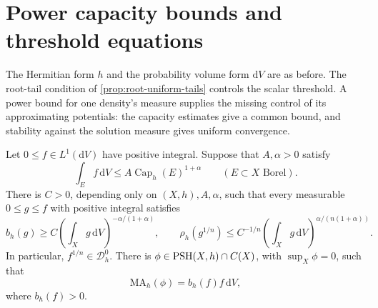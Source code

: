 \section{Power capacity bounds and threshold equations}
\label{sec:power-capacity-threshold}

The Hermitian form $h$ and the probability volume form $\mathrm dV$ are as before. The root-tail condition of \cref{prop:root-uniform-tails} controls the scalar threshold. A power bound for one density's measure supplies the missing control of its approximating potentials: the capacity estimates give a common bound, and stability against the solution measure gives uniform convergence.

\begin{theorem}\label{thm:power-capacity-critical-equation}
Let $0\leq f\in L^1(\mathrm dV)$ have positive integral. Suppose that $A,\alpha>0$ satisfy
\begin{equation}\label{eq:datum-power-capacity}
 \int_Ef\,\mathrm dV\leq A\operatorname{Cap}_h(E)^{1+\alpha}
 \qquad(E\subset X\text{ Borel}).
\end{equation}
There is $C>0$, depending only on $(X,h),A,\alpha$, such that every measurable $0\leq g\leq f$ with positive integral satisfies
\begin{equation}\label{eq:power-capacity-critical-bound}
 b_h(g)\geq C\left(\int_Xg\,\mathrm dV\right)^{-\alpha/(1+\alpha)},
 \qquad
 \rho_h(g^{1/n})\leq C^{-1/n}
        \left(\int_Xg\,\mathrm dV\right)^{\alpha/(n(1+\alpha))}.
\end{equation}
In particular, $f^{1/n}\in\mathcal D_h^0$. There is $\phi\in\mathrm{PSH}(X,h)\cap C(X)$, with $\sup_X\phi=0$, such that
\begin{equation}\label{eq:power-capacity-exact-threshold}
 \mathrm{MA}_h(\phi)=b_h(f)f\,\mathrm dV,
\end{equation}
where $b_h(f)>0$.
\end{theorem}
